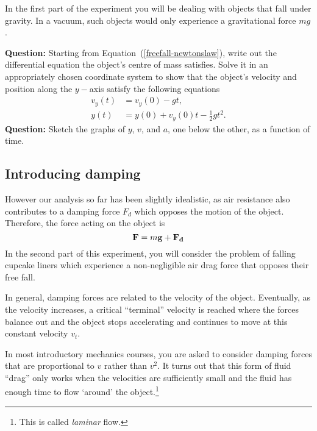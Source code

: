 In the first part of the experiment you will be dealing with objects that fall under gravity. In a vacuum, such objects would only experience a gravitational force $mg$. 

\begin{question}
\textbf{Question:} Starting from Equation~(\ref{freefall-newtonslaw}), write out the differential equation the object's centre of mass satisfies. Solve it in an appropriately chosen coordinate system to show that the object's velocity and position along the $y-$axis satisfy the following equations
\begin{equation}
    \begin{aligned}
    v_y(t) &= v_y(0) - g t,\\
    y(t) &= y(0) + v_y(0) t - \frac{1}{2} g t^2.
    \end{aligned}
\end{equation}
\textbf{Question:} Sketch the graphs of $y$, $v$, and $a$, one below the other, as a function of time. 

\end{question}


\subsection*{Introducing damping}

However our analysis so far has been slightly idealistic, as air resistance also contributes to a damping force $F_{d}$ which opposes the motion of the object. Therefore, the force acting on the object is 
\begin{equation}
    \vb{F} = m \vb{g} + \vb{F_d}
\end{equation}
In the second part of this experiment, you will consider the problem of falling cupcake liners which experience a non-negligible air drag force that opposes their free fall. 

In general, damping forces are related to the velocity of the object. Eventually, as the velocity increases, a critical ``terminal'' velocity is reached where the forces balance out and the object stops accelerating and continues to move at this constant velocity $v_t$.

In most introductory mechanics courses, you are asked to consider damping forces that are proportional to $v$ rather than $v^2$. It turns out that this form of fluid ``drag'' only works when the velocities are sufficiently small and the fluid has enough time to flow `around' the object.\footnote{This is called \textsl{laminar} flow.} 

